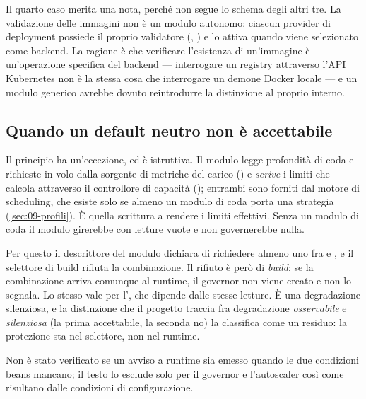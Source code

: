 Il quarto caso merita una nota, perch\'e non segue lo schema degli altri tre. La
validazione delle immagini non \`e un modulo autonomo: ciascun provider di
deployment possiede il proprio validatore
(, ) e lo attiva
quando viene selezionato come backend. La ragione \`e che verificare l'esistenza
di un'immagine \`e un'operazione specifica del backend --- interrogare un
registry attraverso l'API Kubernetes non \`e la stessa cosa che interrogare un
demone Docker locale --- e un modulo generico avrebbe dovuto reintrodurre la
distinzione al proprio interno.

\subsection{Quando un default neutro non \`e accettabile}

Il principio ha un'eccezione, ed \`e istruttiva. Il modulo
 legge profondit\`a di coda e richieste in volo dalla
sorgente di metriche del carico () e \emph{scrive} i
limiti che calcola attraverso il controllore di capacit\`a
(); entrambi sono forniti dal motore di
scheduling, che esiste solo se almeno un modulo di coda porta una strategia
(\cref{sec:09-profili}). \`E quella scrittura a rendere i limiti effettivi.
Senza un modulo di coda il modulo girerebbe con letture vuote e non
governerebbe nulla.

Per questo il descrittore del modulo dichiara di richiedere almeno uno fra
 e , e il selettore di build rifiuta la
combinazione. Il rifiuto \`e per\`o di \emph{build}: se la combinazione arriva
comunque al runtime, il governor non viene creato e non lo segnala. Lo stesso
vale per l', che dipende dalle stesse letture. \`E una
degradazione silenziosa, e la distinzione che il progetto traccia fra
degradazione \emph{osservabile} e \emph{silenziosa} (la prima accettabile, la
seconda no) la classifica come un residuo: la protezione sta nel selettore, non
nel runtime.

\begin{damisurare}
Non \`e stato verificato se un avviso a runtime sia emesso quando le due
condizioni beans mancano; il testo lo esclude solo per il governor e
l'autoscaler cos\`i come risultano dalle condizioni di configurazione.
\end{damisurare}

